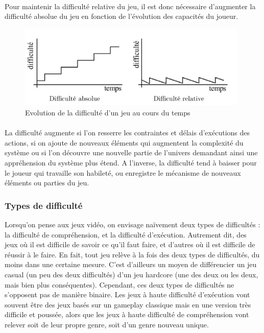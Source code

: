 \paragraph{}Pour maintenir la difficulté relative du jeu, il est donc nécessaire d’augmenter la difficulté absolue du jeu en fonction de l’évolution des capacités du joueur.

\begin{figure}[!htbp]
	\centering
	\includegraphics[width=11cm]{images/evolution_difficulte.png}
	\caption{Evolution de la difficulté d'un jeu au cours du temps}
	\label{evolution_difficulte}
\end{figure}

\paragraph{}La difficulté augmente si l’on resserre les contraintes et délais d’exécutions des actions, si on ajoute de nouveaux éléments qui augmentent la complexité du système ou si l’on découvre une nouvelle partie de l’univers demandant ainsi une appréhension du système plus étend. A l’inverse, la difficulté tend à baisser pour le joueur qui travaille son habileté, ou enregistre le mécanisme de nouveaux éléments ou parties du jeu.

		\subsubsection{Types de difficulté}
Lorsqu'on pense aux jeux vidéo, on envisage naïvement deux types de difficultés : la difficulté de compréhension, et la difficulté d’exécution. Autrement dit, des jeux où il est difficile de savoir ce qu’il faut faire, et d’autres où il est difficile de réussir à le faire. En fait, tout jeu relève à la fois des deux types de difficultés, du moins dans une certaine mesure. C’est d’ailleurs un moyen de différencier un jeu casual (un peu des deux difficultés) d’un jeu hardcore (une des deux ou les deux, mais bien plus conséquentes). Cependant, ces deux types de difficultés ne s’opposent pas de manière binaire. Les jeux à haute difficulté d’exécution vont souvent être des jeux basés sur un gameplay classique mais en une version très difficile et poussée, alors que les jeux à haute difficulté de compréhension vont relever soit de leur propre genre, soit d’un genre nouveau unique. \\

